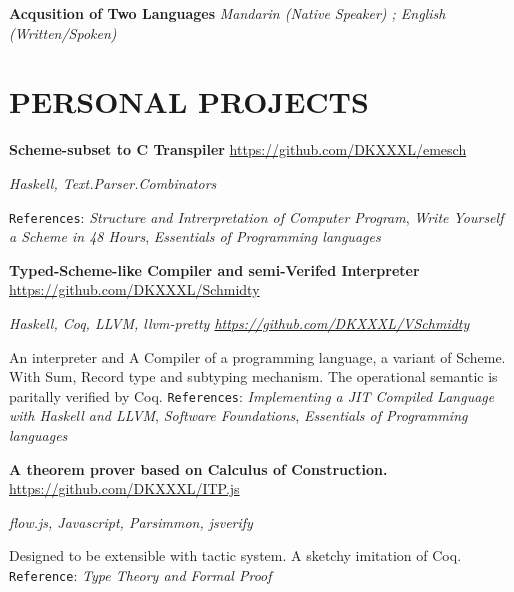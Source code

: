 \documentclass[fontsize=11pt]{article}
\newcommand{\NewPart}[1]{\section*{\uppercase{#1}}}
\newcommand{\SkillEntry}[2]{       %
    \noindent \textbf{#1} \hfill      %
        \noindent \textit{#2} \par        %
}
\newcommand{\EducationEntry}[4]{
    \noindent \textbf{#1} \hfill      %
    \colorbox{Black}{ 
      \parbox{11em}{
      \centering \color{White}#2}} \par  %
    \noindent \textit{#3} \par        %
    \noindent\hangindent=0em\hangafter=0 \small #4 %
    \normalsize \par}
\newcommand{\ProjectEntry}[4]{         %
    \noindent \textbf{#1}  \hfill {#2} \par
    \noindent \textit{#3} \par
    \noindent \small #4 %
    \normalsize \par}
\begin{document}
\SkillEntry{Acqusition of Two Languages}{
    Mandarin (Native Speaker) ; English (Written/Spoken)
}

\NewPart{Personal Projects}{}

\ProjectEntry{Scheme-subset to C Transpiler}{\url{https://github.com/DKXXXL/emesch}}
{Haskell, Text.Parser.Combinators}
{ \texttt{References}: \textit{Structure and Intrerpretation of Computer Program}, \textit{Write Yourself a Scheme in 48 Hours}, \textit{Essentials of Programming languages}}

\ProjectEntry{Typed-Scheme-like  Compiler and semi-Verifed Interpreter }{\url{https://github.com/DKXXXL/Schmidty}}
{Haskell, Coq, LLVM, llvm-pretty \hfill {\normalfont \url{https://github.com/DKXXXL/VSchmidty}}}
{An interpreter and A Compiler of a programming language, a variant of Scheme. With Sum, Record type and subtyping mechanism.  
The operational semantic is paritally verified by Coq. 
\texttt{References}: \textit{Implementing a JIT Compiled Language with Haskell and LLVM}, \textit{Software Foundations}, \textit{Essentials of Programming languages} }

\ProjectEntry{A theorem prover based on Calculus of Construction.}{\url{ https://github.com/DKXXXL/ITP.js}}
{flow.js, Javascript, Parsimmon, jsverify }
{Designed to be extensible with tactic system. 
A sketchy imitation of Coq. 
\texttt{Reference}: \textit{Type Theory and Formal Proof}
}



\ 
\end{document}
